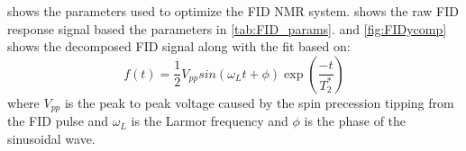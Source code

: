 shows the parameters used to optimize the FID NMR system.  shows the raw FID response signal based the parameters in \cref{tab:FID_params}.  and \cref{fig:FIDycomp} shows the decomposed FID signal along with the fit based on: 
\begin{equation}
    f(t) = \frac{1}{2} V_{pp} sin(\omega_L t + \phi) \exp\left( \frac{-t}{T_2^*}    \right)
    \label{eq:FID}
\end{equation}
where $V_{pp}$ is the peak to peak voltage caused by the spin precession tipping from the FID pulse and $\omega_L$ is the Larmor frequency and $\phi$ is the phase of the sinusoidal wave.



